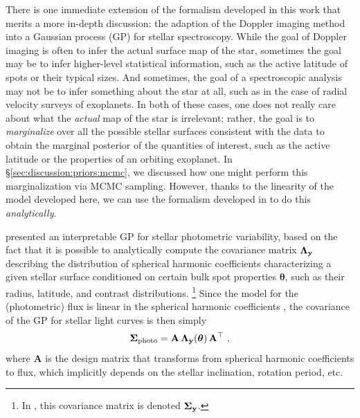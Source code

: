 \documentclass[modern]{aastex631}
\begin{document}
There is one immediate extension of the formalism developed in this work that merits a more in-depth discussion: the adaption of the Doppler imaging method into a Gaussian process (GP) for stellar spectroscopy.
While the goal of Doppler imaging is often to infer the actual surface map of the star, sometimes the goal may be to infer higher-level statistical information, such as the active latitude of spots or their typical sizes.
And sometimes, the goal of a spectroscopic analysis may not be to infer something about the star at all, such as in the case of radial velocity surveys of exoplanets.
In both of these cases, one does not really care about what the \emph{actual} map of the star is irrelevant; rather, the goal is to \emph{marginalize} over all the possible stellar surfaces consistent with the data to obtain the marginal posterior of the quantities of interest, such as the active latitude or the properties of an orbiting exoplanet.
In \S\ref{sec:discussion:priors:mcmc}, we discussed how one might perform this marginalization via MCMC sampling.
However, thanks to the linearity of the model developed here, we can use the formalism developed in \citet{Luger2021b} to do this \emph{analytically}.

\citet{Luger2021b} presented an interpretable GP for stellar photometric variability, based on the fact that it is possible to analytically compute the covariance matrix $\boldsymbol{\Lambda}_{\mathbf{y}}$ describing the distribution of spherical harmonic coefficients characterizing a given stellar surface conditioned on certain bulk spot properties $\boldsymbol{\theta}$, such as their radius, latitude, and contrast distributions.%
\footnote{In \citet{Luger2021b}, this covariance matrix is denoted $\boldsymbol{\Sigma}_{\mathbf{y}}$.}
Since the model for the (photometric) flux is linear in the spherical harmonic coefficients \citep{Luger2019}, the covariance of the GP for stellar light curves is then simply
%
\begin{align}
    \boldsymbol{\Sigma}_\mathrm{photo} = \mathbf{A} \, \boldsymbol{\Lambda}_{\mathbf{y}} (\boldsymbol{\theta}) \, \mathbf{A}^\top
    \hskip 0.33em,
\end{align}
%
where $\mathbf{A}$ is the design matrix that transforms from spherical harmonic coefficients to flux, which implicitly depends on the stellar inclination, rotation period, etc.
\end{document}
